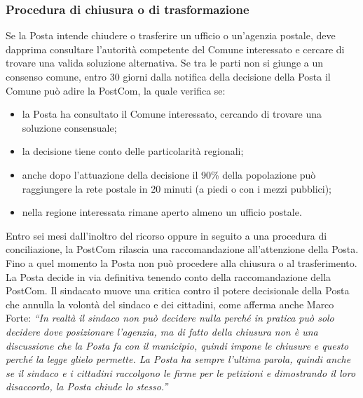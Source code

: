 \subsubsection{Procedura di chiusura o di trasformazione}
Se la Posta intende chiudere o trasferire un ufficio o un’agenzia postale, deve dapprima consultare l’autorità competente del Comune interessato e cercare di trovare una valida soluzione alternativa.
Se tra le parti non si giunge a un consenso comune, entro 30 giorni dalla notifica della decisione della Posta il Comune può adire la PostCom, la quale verifica se:
\begin{itemize}
    \item la Posta ha consultato il Comune interessato, cercando di trovare una soluzione consensuale;
    \item la decisione tiene conto delle particolarità regionali;
    \item anche dopo l’attuazione della decisione il 90\% della popolazione può raggiungere la rete postale in 20 minuti (a piedi o con i mezzi pubblici);
    \item nella regione interessata rimane aperto almeno un ufficio postale.
\end{itemize}
Entro sei mesi dall’inoltro del ricorso oppure in seguito a una procedura di conciliazione, la PostCom rilascia una raccomandazione all’attenzione della Posta. Fino a quel momento la Posta non può procedere alla chiusura o al trasferimento. La Posta decide in via definitiva tenendo conto della raccomandazione della PostCom.
Il sindacato muove una critica contro il potere decisionale della Posta che annulla la volontà del sindaco e dei cittadini, come afferma anche Marco Forte: \textit{“In realtà il sindaco non può decidere nulla perché in pratica può solo decidere dove posizionare l’agenzia, ma di fatto della chiusura non è una discussione che la Posta fa con il municipio, quindi impone le chiusure e questo perché la legge glielo permette. La Posta ha sempre l’ultima parola, quindi anche se il sindaco e i cittadini raccolgono le firme per le petizioni e dimostrando il loro disaccordo, la Posta chiude lo stesso.”}

